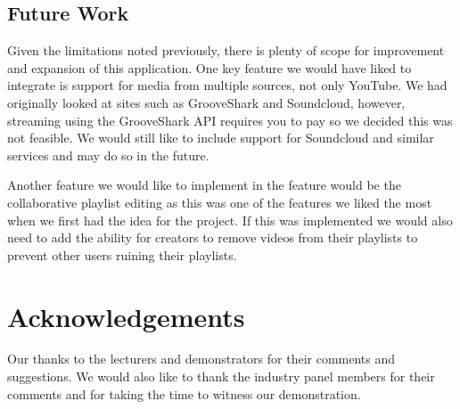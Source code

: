 \documentclass{sig-alt-release2}
\begin{document}
\subsection{Future Work}
Given the limitations noted previously, there is plenty of scope for improvement and expansion of this application. One key feature we would have liked to integrate is support for media from multiple sources, not only YouTube. We had originally looked at sites such as GrooveShark and Soundcloud, however, streaming using the GrooveShark API requires you to pay so we decided this was not feasible. We would still like to include support for Soundcloud and similar services and may do so in the future.

Another feature we would like to implement in the feature would be the collaborative playlist editing as this was one of the features we liked the most when we first had the idea for the project. If this was implemented we would also need to add the ability for creators to remove videos from their playlists to prevent other users ruining their playlists.

\section{Acknowledgements}
Our thanks to the lecturers and demonstrators for their comments and
suggestions.
We would also like to thank the industry panel members for their
comments and for taking the time to witness our demonstration.



\end{document}

